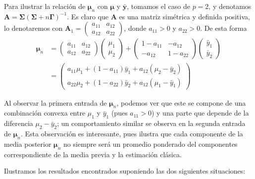 \documentclass[
  10pt,
  spanish,
]{book}
\theoremstyle{definition}
\theoremstyle{definition}
\theoremstyle{definition}
\theoremstyle{definition}
\theoremstyle{remark}
\begin{document}
Para ilustrar la relación de \(\boldsymbol \mu_n\) con \(\boldsymbol \mu\) y \(\bar{\mathbf{y}}\), tomamos el caso de \(p=2\), y denotamos \(\mathbf{A}=\boldsymbol \Sigma\left(\boldsymbol \Sigma+n\boldsymbol \Gamma\right)^{-1}\). Es claro que \(\mathbf{A}\) es una matriz simétrica y definida positiva, lo denotaremos con \(\mathbf{A}_1=\begin{pmatrix}a_{11}&a_{12}\\ a_{12}&a_{22}\end{pmatrix}\), donde \(a_{11}>0\) y \(a_{22}>0\). De esta forma
\begin{align*}
\boldsymbol \mu_n&=\begin{pmatrix}a_{11}&a_{12}\\ a_{12}&a_{22}\end{pmatrix}\begin{pmatrix}\mu_{1}\\ \mu_{2}\end{pmatrix}+\begin{pmatrix}1-a_{11}&-a_{12}\\ -a_{12}&1-a_{22}\end{pmatrix}\begin{pmatrix}\bar{y}_{1}\\ \bar{y}_{2}\end{pmatrix}\\
&=\begin{pmatrix}a_{11}\mu_1+(1-a_{11})\bar{y}_{1}+a_{12}(\mu_2-\bar{y}_{2})\\a_{22}\mu_2+(1-a_{22})\bar{y}_{2}+a_{12}(\mu_1-\bar{y}_{1})\end{pmatrix}
\end{align*}

Al observar la primera entrada de \(\boldsymbol \mu_n\), podemos ver que este se compone de una combinación convexa entre \(\mu_1\) y \(\bar{y}_1\) (pues \(a_{11}>0\)) y una parte que depende de la diferencia \(\mu_2-\bar{y}_{2}\); un comportamiento similar se observa en la segunda entrada de \(\boldsymbol \mu_n\). Esta observación es interesante, pues ilustra que cada componente de la media posterior \(\boldsymbol \mu_n\) no siempre será un promedio ponderado del componentes correspondiente de la media previa y la estimación clásica.

Ilustramos los resultados encontrados suponiendo las dos siguientes situaciones:
\end{document}
